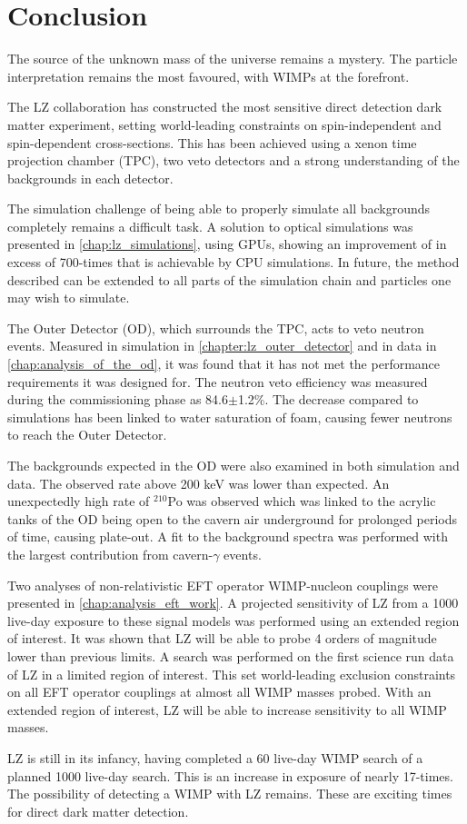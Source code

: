 \chapter{Conclusion}
\label{chap:conclusion}
\par
The source of the unknown mass of the universe remains a mystery.
The particle interpretation remains the most favoured, with WIMPs at the forefront.
\par
The LZ collaboration has constructed the most sensitive direct detection dark matter experiment, setting world-leading constraints on spin-independent and spin-dependent cross-sections.
This has been achieved using a xenon time projection chamber (TPC), two veto detectors and a strong understanding of the backgrounds in each detector.

\par
The simulation challenge of being able to properly simulate all backgrounds completely remains a difficult task.
A solution to optical simulations was presented in \autoref{chap:lz_simulations}, using GPUs, showing an improvement of in excess of 700-times that is achievable by CPU simulations.
In future, the method described can be extended to all parts of the simulation chain and particles one may wish to simulate.

\par
The Outer Detector (OD), which surrounds the TPC, acts to veto neutron events.
Measured in simulation in \autoref{chapter:lz_outer_detector} and in data in \autoref{chap:analysis_of_the_od}, it was found that it has not met the performance requirements it was designed for.
The neutron veto efficiency was measured during the commissioning phase as 84.6$\pm$1.2\%.
The decrease compared to simulations has been linked to water saturation of foam, causing fewer neutrons to reach the Outer Detector.
\par
The backgrounds expected in the OD were also examined in both simulation and data.
The observed rate above 200 keV was lower than expected.
An unexpectedly high rate of ${}^{210}$Po was observed which was linked to the acrylic tanks of the OD being open to the cavern air underground for prolonged periods of time, causing plate-out.
A fit to the background spectra was performed with the largest contribution from cavern-$\gamma$ events.

\par
Two analyses of non-relativistic EFT operator WIMP-nucleon couplings were presented in \autoref{chap:analysis_eft_work}.
A projected sensitivity of LZ from a 1000 live-day exposure to these signal models was performed using an extended region of interest.
It was shown that LZ will be able to probe 4 orders of magnitude lower than previous limits.
A search was performed on the first science run data of LZ in a limited region of interest.
This set world-leading exclusion constraints on all EFT operator couplings at almost all WIMP masses probed.
With an extended region of interest, LZ will be able to increase sensitivity to all WIMP masses.

\par
LZ is still in its infancy, having completed a 60 live-day WIMP search of a planned 1000 live-day search.
This is an increase in exposure of nearly 17-times.
The possibility of detecting a WIMP with LZ remains.
These are exciting times for direct dark matter detection.
